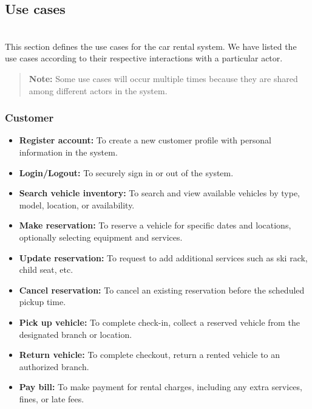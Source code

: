 \subsection{Use cases}\label{uJur_2VFuND2w8FjHmU_R}
\\
This section defines the use cases for the car rental system. We have listed the use cases according to their respective interactions with a particular actor.
\begin{quote}
\textbf{Note:} Some use cases will occur multiple times because they are shared among different actors in the system.
\end{quote}
\subsubsection{Customer}\label{aiGUC0j2FdKPiNQdBQ72R}

\begin{itemize}
\item
\protect{}\label{TtidFhiccnBflOLu5JEsm}
\textbf{Register account:} To create a new customer profile with personal information in the system.
\item
\protect{}\label{Dl8lmOkrwunHC8SpMw7OI}
\textbf{Login/Logout:} To securely sign in or out of the system.
\item
\protect{}\label{L33RkQue8HdYFdcL7S26I}
\textbf{Search vehicle inventory:} To search and view available vehicles by type, model, location, or availability.
\item
\protect{}\label{dqhPs8-cPW1nPsyqOlgPo}
\textbf{Make reservation:} To reserve a vehicle for specific dates and locations, optionally selecting equipment and services.
\item
\protect{}\label{8FoieXQOjv9VNa_7Ui51s}
\textbf{Update reservation:} To request to add additional services such as ski rack, child seat, etc.
\item
\protect{}\label{h0knCgXnlF9JSVo7eZg4F}
\textbf{Cancel reservation:} To cancel an existing reservation before the scheduled pickup time.
\item
\protect{}\label{3SdQJn3ijJB6wRskgN7Zp}
\textbf{Pick up vehicle:} To complete check-in, collect a reserved vehicle from the designated branch or location.
\item
\protect{}\label{hVtXXRQnScAkTzmyX7EpI}
\textbf{Return vehicle:} To complete checkout, return a rented vehicle to an authorized branch.
\item
\protect{}\label{vCICgQYjAplZRkLTrKhy_}
\textbf{Pay bill:} To make payment for rental charges, including any extra services, fines, or late fees.
\end{itemize}

